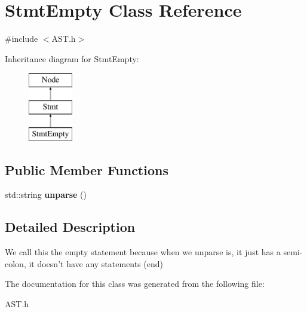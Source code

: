 \hypertarget{classStmtEmpty}{\section{Stmt\-Empty Class Reference}
\label{classStmtEmpty}
}


{\ttfamily \#include $<$A\-S\-T.\-h$>$}

Inheritance diagram for Stmt\-Empty\-:\begin{figure}[H]
\begin{center}
\leavevmode
\includegraphics[height=3.000000cm]{classStmtEmpty}
\end{center}
\end{figure}
\subsection*{Public Member Functions}
\begin{DoxyCompactItemize}
\item 
\hypertarget{classStmtEmpty_acb6a58bc9a8734ebc192da9937826273}{std\-::string {\bfseries unparse} ()}\label{classStmtEmpty_acb6a58bc9a8734ebc192da9937826273}

\end{DoxyCompactItemize}


\subsection{Detailed Description}
We call this the empty statement because when we unparse is, it just has a semi-\/colon,  it doesn't have any statements (end) 

The documentation for this class was generated from the following file\-:\begin{DoxyCompactItemize}
\item 
A\-S\-T.\-h\end{DoxyCompactItemize}
